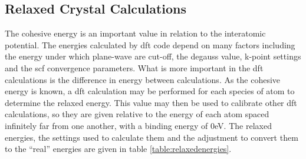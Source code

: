 \subsection{Relaxed Crystal Calculations}

The cohesive energy is an important value in relation to the interatomic potential.  The energies calculated by \acrshort{dft} code depend on many factors including the energy under which plane-wave are cut-off, the degauss value, k-point settings and the \acrshort{scf} convergence parameters.  What is more important in the \acrshort{dft} calculations is the difference in energy between calculations.  As the cohesive energy is known, a \acrshort{dft} calculation may be performed for each species of atom to determine the relaxed energy.  This value may then be used to calibrate other \acrshort{dft} calculations, so they are given relative to the energy of each atom spaced infinitely far from one another, with a binding energy of 0eV.  The relaxed energies, the settings used to calculate them and the adjustment to convert them to the \enquote{real} energies are given in table \ref{table:relaxedenergies}.

